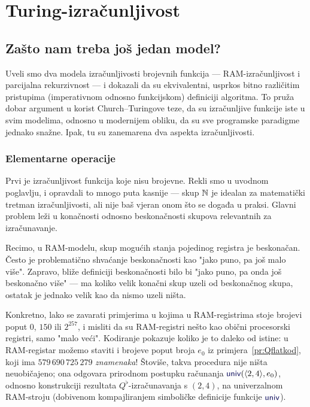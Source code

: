 \chapter{Turing-izračunljivost}\label{ch:Turing}

\section{Zašto nam treba još jedan model?}

Uveli smo dva modela izračunljivosti brojevnih funkcija --- RAM-izračunljivost i parcijalna rekurzivnost --- i dokazali da su ekvivalentni, usprkos bitno različitim pristupima (imperativnom odnosno funkcijskom) definiciji algoritma. To pruža dobar argument u korist Church--\!Turingove teze, da su izračunljive funkcije iste u svim modelima, odnosno u modernijem obliku, da su sve programske paradigme jednako snažne. Ipak, tu su zanemarena dva aspekta izračunljivosti.

\subsection{Elementarne operacije}

Prvi je izračunljivost funkcija koje nisu brojevne. Rekli smo u uvodnom poglavlju, i opravdali to mnogo puta kasnije --- skup ${\mathbb N}$ je idealan za matematički tretman izračunljivosti, ali nije baš vjeran onom što se događa u praksi. Glavni problem leži u konačnosti odnosno beskonačnosti skupova relevantnih za izračunavanje.

Recimo, u RAM-modelu, skup mogućih stanja pojedinog registra je beskonačan. Često je problematično shvaćanje beskonačnosti kao "jako puno, pa još malo više". Zapravo, bliže definiciji beskonačnosti bilo bi "jako puno, pa onda još beskonačno više" --- ma koliko velik konačni skup uzeli od beskonačnog skupa, ostatak je jednako velik kao da nismo uzeli ništa.

Konkretno, lako se zavarati primjerima u kojima u RAM-registrima stoje brojevi poput $0$, $150$ ili $2^{257}$, i misliti da su RAM-registri nešto kao obični procesorski registri, samo "malo veći". Kodiranje pokazuje koliko je to daleko od istine: u RAM-registar možemo staviti i brojeve poput broja $e_0$ iz primjera~\ref{pr:Qflatkod}, koji ima $579\,690\,725\,279$ \emph{znamenaka}! Štoviše, takva procedura nije ništa neuobičajeno; ona odgovara prirodnom postupku računanja $\f{univ}(\kr{2,4},e_0)$, odnosno konstrukciji rezultata $Q^\flat$-izračunavanja s $(2,4)$, na univerzalnom RAM-stroju (dobivenom kompajliranjem simboličke definicije funkcije $\f{univ}$).

